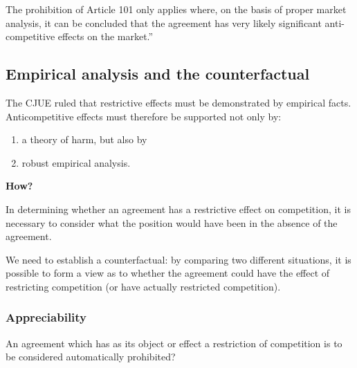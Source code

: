         The prohibition of Article 101 only applies where, on the basis of proper market analysis, it can be concluded that the agreement has very likely significant anti-competitive effects on the market.”

    \subsection{Empirical analysis and the counterfactual}

        The CJUE ruled that restrictive effects must be demonstrated by empirical facts. Anticompetitive effects must therefore be supported not only by:
        \begin{enumerate}[label=\Roman*.]
            \item a theory of harm, but also by
            \item robust empirical analysis.
        \end{enumerate}
        
        \textbf{How?}
        
        In determining whether an agreement has a restrictive effect on competition, it is necessary to consider what the position would have been in the absence of the agreement.
        
        We need to establish a counterfactual: by comparing two different situations, it is possible to form a view as to whether the agreement could have the effect of restricting competition (or have actually restricted competition).
        
        \subsubsection{Appreciability}

        An agreement which has as its object or effect a restriction of competition is to be considered automatically prohibited?

